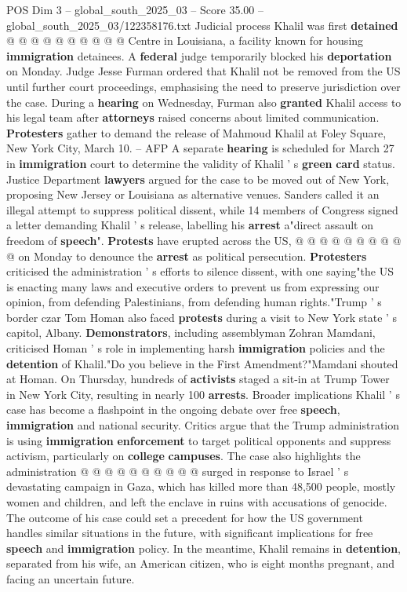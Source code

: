 \begin{textsample}{POS Dim 3 – global\_south\_2025\_03 – Score 35.00 – global\_south\_2025\_03/122358176.txt}
Judicial process Khalil was first \textbf{detained} @ @ @ @ @ @ @ @ @ @ Centre in Louisiana, a facility known for housing \textbf{immigration} detainees.
A \textbf{federal} judge temporarily blocked his \textbf{deportation} on Monday.
Judge Jesse Furman ordered that Khalil not be removed from the US until further court proceedings, emphasising the need to preserve jurisdiction over the case.
During a \textbf{hearing} on Wednesday, Furman also \textbf{granted} Khalil access to his legal team after \textbf{attorneys} raised concerns about limited communication. \textbf{Protesters} gather to demand the release of Mahmoud Khalil at Foley Square, New York City, March 10. -- AFP A separate \textbf{hearing} is scheduled for March 27 in \textbf{immigration} court to determine the validity of Khalil ' s \textbf{green} \textbf{card} status.
Justice Department \textbf{lawyers} argued for the case to be moved out of New York, proposing New Jersey or Louisiana as alternative venues.
Sanders called it an illegal attempt to suppress political dissent, while 14 members of Congress signed a letter demanding Khalil ' s release, labelling his \textbf{arrest} a"direct assault on freedom of \textbf{speech}". \textbf{Protests} have erupted across the US, @ @ @ @ @ @ @ @ @ @ on Monday to denounce the \textbf{arrest} as political persecution. \textbf{Protesters} criticised the administration ' s efforts to silence dissent, with one saying"the US is enacting many laws and executive orders to prevent us from expressing our opinion, from defending Palestinians, from defending human rights."Trump ' s border czar Tom Homan also faced \textbf{protests} during a visit to New York state ' s capitol, Albany. \textbf{Demonstrators}, including assemblyman Zohran Mamdani, criticised Homan ' s role in implementing harsh \textbf{immigration} policies and the \textbf{detention} of Khalil."Do you believe in the First Amendment?"Mamdani shouted at Homan.
On Thursday, hundreds of \textbf{activists} staged a sit-in at Trump Tower in New York City, resulting in nearly 100 \textbf{arrests}.
Broader implications Khalil ' s case has become a flashpoint in the ongoing debate over free \textbf{speech}, \textbf{immigration} and national security.
Critics argue that the Trump administration is using \textbf{immigration} \textbf{enforcement} to target political opponents and suppress activism, particularly on \textbf{college} \textbf{campuses}.
The case also highlights the administration @ @ @ @ @ @ @ @ @ @ surged in response to Israel ' s devastating campaign in Gaza, which has killed more than 48,500 people, mostly women and children, and left the enclave in ruins with accusations of genocide.
The outcome of his case could set a precedent for how the US government handles similar situations in the future, with significant implications for free \textbf{speech} and \textbf{immigration} policy.
In the meantime, Khalil remains in \textbf{detention}, separated from his wife, an American citizen, who is eight months pregnant, and facing an uncertain future.


\end{textsample}
